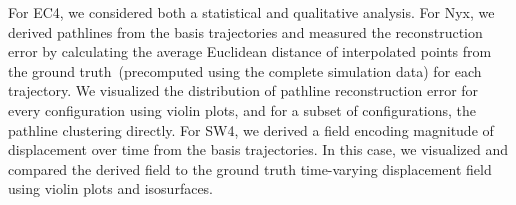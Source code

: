 For EC4, we considered both a statistical and qualitative analysis. 
%
For Nyx, we derived pathlines from the basis trajectories and measured the reconstruction error by calculating the average Euclidean distance of interpolated points from the ground truth~(precomputed using the complete simulation data) for each trajectory.
%
We visualized the distribution of pathline reconstruction error for every configuration using violin plots, and for a subset of configurations, the pathline clustering directly.
%
For SW4, we derived a field encoding magnitude of displacement over time from the basis trajectories.
%
In this case, we visualized and compared the derived field to the ground truth time-varying displacement field using violin plots and isosurfaces.
%
%
%
%
%
%
%

